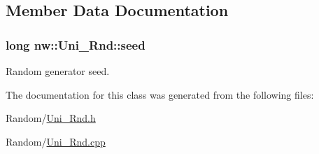 \subsection{Member Data Documentation}
\hypertarget{classnw_1_1_uni___rnd_a0b5e34f5df24a4e15eed8be7b15a695c}{
\subsubsection[{seed}]{\setlength{\rightskip}{0pt plus 5cm}long nw\+::\+Uni\+\_\+\+Rnd\+::seed\hspace{0.3cm}{\ttfamily [private]}}}\label{classnw_1_1_uni___rnd_a0b5e34f5df24a4e15eed8be7b15a695c}


Random generator seed. 



The documentation for this class was generated from the following files\+:\begin{DoxyCompactItemize}
\item 
Random/\hyperlink{_uni___rnd_8h}{Uni\+\_\+\+Rnd.\+h}\item 
Random/\hyperlink{_uni___rnd_8cpp}{Uni\+\_\+\+Rnd.\+cpp}\end{DoxyCompactItemize}
